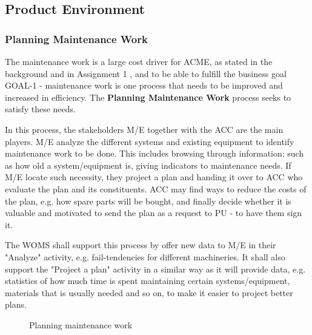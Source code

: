 \subsection{Product Environment}
\label{sec:product_environment}

\subsubsection{Planning Maintenance Work}
\label{sec:bp1}
The maintenance work is a large cost driver for ACME, as stated in the background and in Assignment 1 \cite{I}, and to be able to fulfill the business goal GOAL-1 - maintenance work is one process that needs to be improved and increased in efficiency. The \textbf{Planning Maintenance Work} process seeks to satisfy these needs. 

In this process, the stakeholders M/E together with the ACC are the main players. M/E analyze the different systems and existing equipment to identify maintenance work to be done. This includes browsing through information; such as how old a system/equipment is, giving indicators to maintenance needs. If M/E locate such necessity, they project a plan and handing it over to ACC who evaluate the plan and its constituents. ACC may find ways to reduce the costs of the plan, e.g. how spare parts will be bought, and finally decide whether it is valuable and motivated to send the plan as a request to PU - to have them sign it.

The WOMS shall support this process by offer new data to M/E in their "Analyze" activity, e.g. fail-tendencies for different machineries. It shall also support the "Project a plan" activity in a similar way as it will provide data, e.g. statistics of how much time is spent maintaining certain systems/equipment, materials that is usually needed and so on, to make it easier to project better plans.
\begin{figure}[H]
	\centering
	\setlength\fboxsep{7pt}
	\setlength\fboxrule{0.5pt}
	\label{fig:planning}
	\caption{Planning maintenance work}
\end{figure}
%
